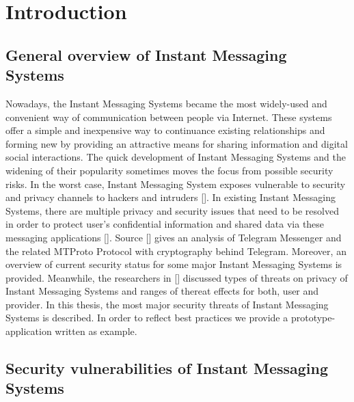 \chapter{Introduction}\label{ch:introduction}


\newcommand{\keyword}[1]{\textbf{#1}}
\newcommand{\tabhead}[1]{\textbf{#1}}
\newcommand{\code}[1]{\texttt{#1}}
\newcommand{\file}[1]{\texttt{\bfseries#1}}
\newcommand{\option}[1]{\texttt{\itshape#1}}



\section{General overview of Instant Messaging Systems}\label{sec:general-overview-of-im-system}
Nowadays, the Instant Messaging Systems became the most widely-used and convenient way of communication between
people via Internet.
These systems offer a simple and inexpensive way to continuance existing relationships and forming new by providing an
attractive means for sharing information and digital social interactions.
The quick development of Instant Messaging Systems and the widening of their popularity sometimes moves the focus from possible security risks.
In the worst case, Instant Messaging System exposes vulnerable to security and privacy channels to hackers and intruders
[\cite{mcclure2009hacking, mannan2005secure}].
In existing Instant Messaging Systems, there are multiple privacy and security issues that need to be resolved in order
to protect user's confidential information and shared data via these messaging applications [\cite{loesing2006privacy}].
Source [\cite{job2015modified}] gives an analysis of Telegram Messenger and the related MTProto Protocol with cryptography
behind Telegram.
Moreover, an overview of current security status for some major Instant Messaging Systems is provided.
Meanwhile, the researchers in [\cite{khan2015survey}] discussed types of threats on privacy of Instant Messaging Systems
and ranges of thereat effects for both, user and provider.
In this thesis, the most major security threats of Instant Messaging Systems is described.
In order to reflect best practices we provide a prototype-application written as example.


\section{Security vulnerabilities of Instant Messaging Systems}\label{sec:security-vulnerabilities-of-instant-messaging-systems}


